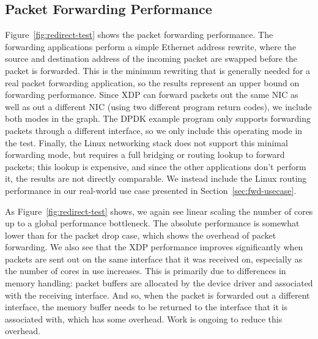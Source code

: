 \documentclass[10pt,sigconf,anonymous]{acmart}
\begin{document}
\subsection{Packet Forwarding Performance}
\label{sec:pack-forw-perf}
Figure~\ref{fig:redirect-test} shows the packet forwarding performance. The
forwarding applications perform a simple Ethernet address rewrite, where the
source and destination address of the incoming packet are swapped before the
packet is forwarded. This is the minimum rewriting that is generally needed for
a real packet forwarding application, so the results represent an upper bound on
forwarding performance. Since XDP can forward packets out the same NIC as well
as out a different NIC (using two different program return codes), we include
both modes in the graph. The DPDK example program only supports forwarding
packets through a different interface, so we only include this operating mode in
the test. Finally, the Linux networking stack does not support this minimal
forwarding mode, but requires a full bridging or routing lookup to forward
packets; this lookup is expensive, and since the other applications don't
perform it, the results are not directly comparable. We instead include the
Linux routing performance in our real-world use case presented in
Section~\ref{sec:fwd-usecase}.

As Figure~\ref{fig:redirect-test} shows, we again see linear scaling the number
of cores up to a global performance bottleneck. The absolute performance is
somewhat lower than for the packet drop case, which shows the overhead of packet
forwarding. We also see that the XDP performance improves significantly when
packets are sent out on the same interface that it was received on, especially
as the number of cores in use increases. This is primarily due to differences in
memory handling: packet buffers are allocated by the device driver and
associated with the receiving interface. And so, when the packet is forwarded
out a different interface, the memory buffer needs to be returned to the
interface that it is associated with, which has some overhead. Work is ongoing
to reduce this overhead.
\end{document}
